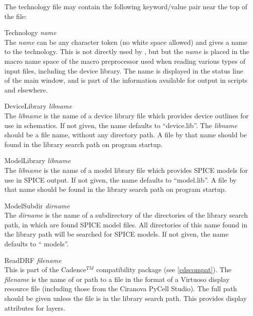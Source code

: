 The technology file may contain the following keyword/value pair
near the top of the file:
\begin{description}
\item{\vt Technology} {\it name}\\
The {\it name} can be any character token (no white space allowed)
and gives a name to the technology.  This is not directly used by
{\Xic}, but but the {\it name} is placed in the macro name space of
the macro preprocessor used when reading various types of input
files, including the device library.  The name is displayed in the
status line of the main window, and is part of the information
available for output in scripts and elsewhere.

\item{\vt DeviceLibrary} {\it libname}\\
The {\it libname} is the name of a device library file which provides
device outlines for use in schematics.  If not given, the name
defaults to ``{\vt device.lib}''.  The {\it libname} should be a file
name, without any directory path.  A file by that name should be found
in the library search path on program startup.

\item{\vt ModelLibrary} {\it libname}\\
The {\it libname} is the name of a model library file which provides
SPICE models for use in SPICE output.  If not given, the name defaults
to ``{\vt model.lib}''.  A file by that name should be found in the
library search path on program startup.

\item{\vt ModelSubdir} {\it dirname}\\
The {\it dirname} is the name of a subdirectory of the directories of
the library search path, in which are found SPICE model files.  All
directories of this name found in the library path will be searched
for SPICE models.  If not given, the name defaults to ``{\vt
models}''.

\item{\vt ReadDRF} {\it filename}\\
This is part of the Cadence$^{TM}$ compatibility package (see
\ref{cdscompat}).  The {\it filename} is the name of or path to a file
in the format of a Virtuoso display resource file (including those
from the Ciranova PyCell Studio).  The full path should be given
unless the file is in the library search path.  This provides display
attributes for layers.


\end{description}
